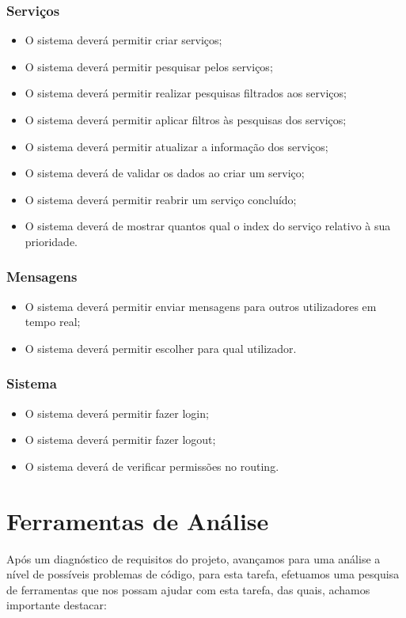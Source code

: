 \documentclass[a4paper,12pt]{article} %
\begin{document}
\newpage
\subsubsection{Serviços}
\begin{itemize}
	\item O sistema deverá permitir criar serviços;
	\item O sistema deverá permitir pesquisar pelos serviços;
	\item O sistema deverá permitir realizar pesquisas filtrados aos serviços;
	\item O sistema deverá permitir aplicar filtros às pesquisas dos serviços;
	\item O sistema deverá permitir atualizar a informação dos serviços;
	\item O sistema deverá de validar os dados ao criar um serviço;
	\item O sistema deverá permitir reabrir um serviço concluído;
	\item O sistema deverá de mostrar quantos qual o index do serviço relativo à sua prioridade.
\end{itemize}

\subsubsection{Mensagens}
\begin{itemize}
	\item O sistema deverá permitir enviar mensagens para outros utilizadores em tempo real;
	\item O sistema deverá permitir escolher para qual utilizador.
\end{itemize}

\subsubsection{Sistema}
\begin{itemize}
	\item O sistema deverá permitir fazer login;
	\item O sistema deverá permitir fazer logout;
	\item O sistema deverá de verificar permissões no routing.
\end{itemize}

\newpage
\section{Ferramentas de Análise}
Após um diagnóstico de requisitos do projeto, avançamos para uma análise a nível de possíveis problemas de código, para esta tarefa, efetuamos uma pesquisa de ferramentas que nos possam ajudar com esta tarefa, das quais, achamos importante destacar:
\end{document}
